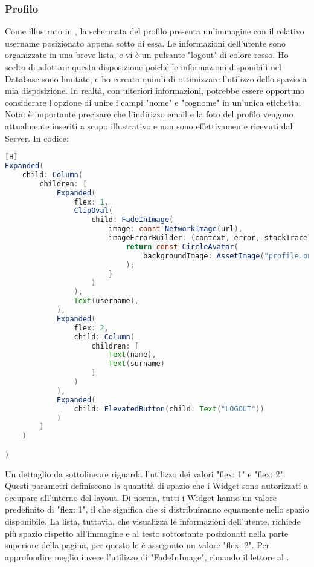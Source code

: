 \subsubsection{Profilo}
Come illustrato in , la schermata del profilo presenta un'immagine con il relativo username posizionato appena sotto di essa. Le informazioni dell'utente sono organizzate in una breve lista, e vi è un pulsante "logout" di colore rosso. Ho scelto di adottare questa disposizione poiché le informazioni disponibili nel Database sono limitate, e ho cercato quindi di ottimizzare l'utilizzo dello spazio a mia disposizione. In realtà, con ulteriori informazioni, potrebbe essere opportuno considerare l'opzione di unire i campi "nome" e "cognome" in un'unica etichetta.\\
Nota: è importante precisare che l'indirizzo email e la foto del profilo vengono attualmente inseriti a scopo illustrativo e non sono effettivamente ricevuti dal Server. In codice:
\begin{lstlisting}[language=Java, firstnumber=1][H]
Expanded(
	child: Column(
		children: [
			Expanded(
				flex: 1,
				ClipOval(
					child: FadeInImage(
						image: const NetworkImage(url),
						imageErrorBuilder: (context, error, stackTrace) {
							return const CircleAvatar(
								backgroundImage: AssetImage("profile.png")
							);
						}
					)
				),
				Text(username),
			),
			Expanded(
				flex: 2,
				child: Column(
					children: [
						Text(name),
						Text(surname)
					]
				)
			),
			Expanded(
				child: ElevatedButton(child: Text("LOGOUT"))
			)
		]
	)

)	
\end{lstlisting}

\noindent
Un dettaglio da sottolineare riguarda l'utilizzo dei valori "flex: 1" e "flex: 2". Questi parametri definiscono la quantità di spazio che i Widget sono autorizzati a occupare all'interno del layout. Di norma, tutti i Widget hanno un valore predefinito di "flex: 1", il che significa che si distribuiranno equamente nello spazio disponibile. La lista, tuttavia, che visualizza le informazioni dell'utente, richiede più spazio rispetto all'immagine e al testo sottostante posizionati nella parte superiore della pagina, per questo le è assegnato un valore "flex: 2". Per approfondire meglio invece l'utilizzo di "FadeInImage", rimando il lettore al .

